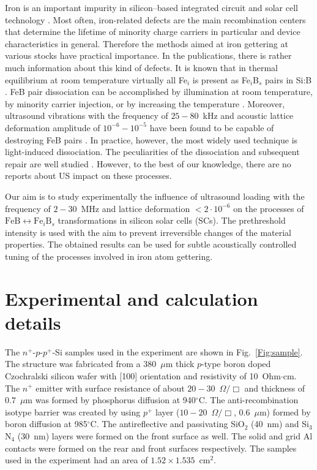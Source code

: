 \documentclass[%
 aip,
 amsmath,amssymb,
 reprint,%
]{revtex4-1}
\begin{document}
Iron is an important impurity in silicon--based integrated circuit and solar cell technology \cite{Istratov2000}. 
Most often, iron-related defects are the main recombination centers that determine the lifetime of  minority charge carriers in particular and device characteristics in general. 
Therefore the methods aimed at iron gettering at various stocks have practical importance. 
In the publications, there is rather much information about this kind of defects. 
It is known that in thermal equilibrium at room temperature virtually all Fe$_i$ is present as Fe$_i$B$_s$ pairs in Si:B \cite{FeBLight2,FeBJAP2005}.
FeB pair dissociation can be accomplished by illumination at room temperature, by minority carrier injection, or by increasing the temperature \cite{FeBLight2,FeBAssJAP2014,FeB_Zong}. 
Moreover, ultrasound  vibrations with the frequency of $25-80$~kHz and acoustic lattice deformation amplitude of $10^{-6}-10^{-5}$ have been found to be capable of destroying FeB pairs \cite{Ostapenko1995SST,Ostapenko1994APL}. 
In practice, however, the most widely used technique is light-induced dissociation. 
The peculiarities of the dissociation and subsequent repair are well studied \cite{FeBLight2,FeBKin2019,FeBAssJAP2014,FeBJAP2005,FeBAssSST2011,lauer2016,FeBStrongIll,FeBkinAPL2008,FeBKinAPL2013}. However, to the best of our knowledge, there are no reports about US impact on these processes.

Our aim is to study experimentally the influence of ultrasound loading with the 
frequency of $2-30$~MHz and  lattice deformation $<2\cdot10^{-6}$ on the 
processes of $\mathrm{FeB}\leftrightarrow\mathrm{Fe}_i\mathrm{B}_s$ transformations in silicon solar cells (SCs). 
The prethreshold intensity is used with the aim to prevent irreversible changes of the material properties. 
The obtained results can be used for subtle acoustically controlled tuning of the processes involved in iron atom gettering.

\section{\label{sec:Exp}Experimental and calculation details}


The $n^+$-$p$-$p^+$-Si samples used in the experiment are shown in Fig.~\ref{Fig:sample}. 
The structure was fabricated from a 380~$\mu$m thick $p$-type boron doped 
Czochralski silicon wafer with [100] orientation and resistivity of 10~Ohm$\cdot$cm.
The $n^+$ emitter with surface resistance of about $20-30$~$\Omega/\Box$
and  thickness of $0.7$~$\mu$m was formed by phosphorus diffusion at 940$^\circ$C.
The anti-recombination isotype barrier was created by using $p^+$ 
layer ($10-20$~$\Omega/\Box$, $0.6$~$\mu$m) formed by boron diffusion at 985$^\circ$C. 
The antireflective and passivating SiO$_2$ (40~nm) and Si$_3$N$_4$ (30~nm) layers 
were formed on the front surface as well.
The solid and grid Al contacts were formed on the rear and front surfaces respectively. 
The samples used in the experiment had an area of $1.52\times1.535$~cm$^2$.
\end{document}
